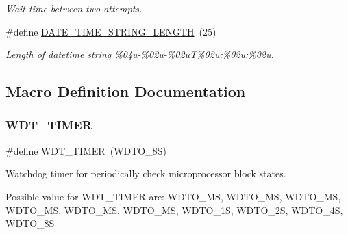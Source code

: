 \begin{DoxyCompactItemize}
\begin{DoxyCompactList}\small\item\em Wait time between two attempts. \end{DoxyCompactList}\item 
\mbox{\label{rmap-config_8h_ae32b4bc47b1cc742b6f73d840bf8b2fa}} 
\#define \hyperlink{rmap-config_8h_ae32b4bc47b1cc742b6f73d840bf8b2fa}{D\+A\+T\+E\+\_\+\+T\+I\+M\+E\+\_\+\+S\+T\+R\+I\+N\+G\+\_\+\+L\+E\+N\+G\+TH}~(25)
\begin{DoxyCompactList}\small\item\em Length of datetime string \%04u-\/\%02u-\/\%02uT\%02u\+:\%02u\+:\%02u. \end{DoxyCompactList}\end{DoxyCompactItemize}


\subsection{Macro Definition Documentation}
\mbox{\label{rmap-config_8h_a983c9777673ee873f12ec9f489215321}} 
\subsubsection{\texorpdfstring{W\+D\+T\+\_\+\+T\+I\+M\+ER}{WDT\_TIMER}}
{\footnotesize\ttfamily \#define W\+D\+T\+\_\+\+T\+I\+M\+ER~(W\+D\+T\+O\+\_\+8S)}



Watchdog timer for periodically check microprocessor block states. 

Possible value for W\+D\+T\+\_\+\+T\+I\+M\+ER are\+: W\+D\+T\+O\+\_\+MS, W\+D\+T\+O\+\_\+MS, W\+D\+T\+O\+\_\+MS, W\+D\+T\+O\+\_\+MS, W\+D\+T\+O\+\_\+MS, W\+D\+T\+O\+\_\+MS, W\+D\+T\+O\+\_\+1S, W\+D\+T\+O\+\_\+2S, W\+D\+T\+O\+\_\+4S, W\+D\+T\+O\+\_\+8S 